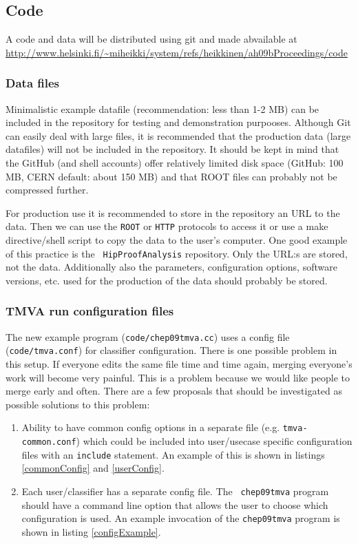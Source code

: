 \begin{appendix}
\begin{itemize}
\end{itemize}
\subsection{Code}
A code and data will be distributed using git and made abvailable 
at \\ \url{http://www.helsinki.fi/~miheikki/system/refs/heikkinen/ah09bProceedings/code}

\subsubsection{Data files}
Minimalistic example datafile (recommendation: less than 1-2 MB) can
be included in the repository for testing and demonstration
purpooses. Although Git can easily deal with large files, it is
recommended that the production data (large datafiles) will not be
included in the repository. It should be kept in mind that the GitHub
(and shell accounts) offer relatively limited disk space (GitHub: 100
MB, CERN default: about 150 MB) and that ROOT files can probably not be
compressed further.

For production use it is recommended to store in the repository an URL
to the data. Then we can use the {\tt ROOT} or {\tt HTTP} protocols to
access it or use a make directive/shell script to copy the data to the
user's computer. One good example of this practice is the {\tt
HipProofAnalysis} repository. Only the URL:s are stored, not the
data. Additionally also the parameters, configuration options,
software versions, etc. used for the production of the data should
probably be stored.

\subsubsection{TMVA run configuration files}

The new example program ({\tt code/chep09tmva.cc}) uses a config file
({\tt code/tmva.conf}) for classifier configuration. There is one
possible problem in this setup. If everyone edits the same file time
and time again, merging everyone's work will become very painful. This
is a problem because we would like people to merge early and
often. There are a few proposals that should be investigated as
possible solutions to this problem:
\begin{enumerate}
\item Ability to have common config options in a separate file
(e.g. {\tt tmva-common.conf}) which could be included into
user/usecase specific configuration files with an {\tt include}
statement. An example of this is shown in listings \ref{commonConfig}
and \ref{userConfig}.
\item Each user/classifier has a separate config file. The {\tt
chep09tmva} program should have a command line option that allows the
user to choose which configuration is used. An example invocation of
the {\tt chep09tmva} program is shown in listing \ref{configExample}.
\end{enumerate}


\end{appendix}
